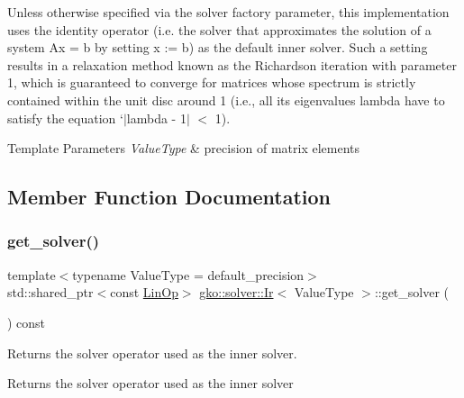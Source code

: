 Unless otherwise specified via the {\ttfamily solver} factory parameter, this implementation uses the identity operator (i.\+e. the solver that approximates the solution of a system Ax = b by setting x \+:= b) as the default inner solver. Such a setting results in a relaxation method known as the Richardson iteration with parameter 1, which is guaranteed to converge for matrices whose spectrum is strictly contained within the unit disc around 1 (i.\+e., all its eigenvalues {\ttfamily lambda} have to satisfy the equation `$\vert$lambda -\/ 1$\vert$ $<$ 1).


\begin{DoxyTemplParams}{Template Parameters}
{\em Value\+Type} & precision of matrix elements \\
\hline
\end{DoxyTemplParams}


\subsection{Member Function Documentation}
\mbox{\label{classgko_1_1solver_1_1Ir_a3996838d5c38740a9777b522317ce3f1}} 
\subsubsection{\texorpdfstring{get\+\_\+solver()}{get\_solver()}}
{\footnotesize\ttfamily template$<$typename Value\+Type  = default\+\_\+precision$>$ \\
std\+::shared\+\_\+ptr$<$const \hyperlink{classgko_1_1LinOp}{Lin\+Op}$>$ \hyperlink{classgko_1_1solver_1_1Ir}{gko\+::solver\+::\+Ir}$<$ Value\+Type $>$\+::get\+\_\+solver (\begin{DoxyParamCaption}{ }\end{DoxyParamCaption}) const\hspace{0.3cm}{\ttfamily [inline]}}



Returns the solver operator used as the inner solver. 

\begin{DoxyReturn}{Returns}
the solver operator used as the inner solver 
\end{DoxyReturn}
\mbox{\label{classgko_1_1solver_1_1Ir_a2095b57bb8d3c31e0cfe395c911dbf84}} 
